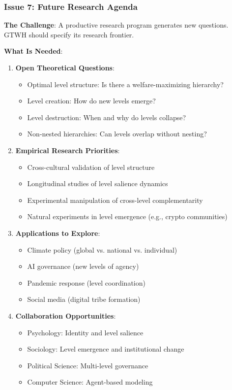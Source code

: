 \subsubsection{Issue 7: Future Research Agenda}

\begin{tcolorbox}[colback=green!5!white, colframe=green!75!black, title=Status: Implicit Only]
\textbf{The Challenge}: A productive research program generates new questions. 
GTWH should specify its research frontier.

\textbf{What Is Needed}:
\begin{enumerate}
\item \textbf{Open Theoretical Questions}:
    \begin{itemize}[nosep]
    \item Optimal level structure: Is there a welfare-maximizing hierarchy?
    \item Level creation: How do new levels emerge?
    \item Level destruction: When and why do levels collapse?
    \item Non-nested hierarchies: Can levels overlap without nesting?
    \end{itemize}

\item \textbf{Empirical Research Priorities}:
    \begin{itemize}[nosep]
    \item Cross-cultural validation of level structure
    \item Longitudinal studies of level salience dynamics
    \item Experimental manipulation of cross-level complementarity
    \item Natural experiments in level emergence (e.g., crypto communities)
    \end{itemize}

\item \textbf{Applications to Explore}:
    \begin{itemize}[nosep]
    \item Climate policy (global vs. national vs. individual)
    \item AI governance (new levels of agency)
    \item Pandemic response (level coordination)
    \item Social media (digital tribe formation)
    \end{itemize}

\item \textbf{Collaboration Opportunities}:
    \begin{itemize}[nosep]
    \item Psychology: Identity and level salience
    \item Sociology: Level emergence and institutional change
    \item Political Science: Multi-level governance
    \item Computer Science: Agent-based modeling
    \end{itemize}
\end{enumerate}


\end{tcolorbox}
